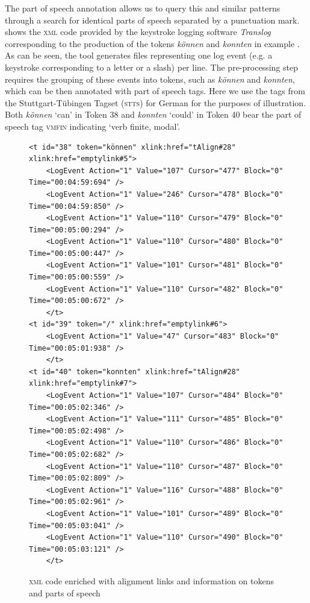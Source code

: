 \documentclass[output=paper]{LSP/langsci}
\begin{document}
The part of speech annotation allows us to query this and similar patterns through a search for identical parts of speech separated by a punctuation mark. 
 shows the \textsc{xml} code provided by the keystroke logging software \textit{Translog} corresponding to the production of the tokens \textit{können} and \textit{konnten} in example . As can be seen, the tool generates files representing one log event (e.g. a keystroke corresponding to a letter or a slash) per line. The pre-processing step requires the grouping of these events into tokens, such as \textit{können} and \textit{konnten}, which can be then annotated with part of speech tags. Here we use the tags from the Stuttgart-Tübingen Tagset (\textsc{stts}) for German \citep{Schiller1999} for the purposes of illustration. Both \textit{können} `can' in Token 38 and \textit{konnten} `could' in Token 40 bear the part of speech tag \textsc{vmfin} indicating `verb finite, modal'. 


\begin{figure}[t]

\caption{\textsc{xml} code enriched with alignment links and information on tokens and parts of speech} \label{fig:1:2}
\begin{lstlisting}
<t id="38" token="können" xlink:href="tAlign#28" xlink:href="emptylink#5">
    <LogEvent Action="1" Value="107" Cursor="477" Block="0" Time="00:04:59:694" />
    <LogEvent Action="1" Value="246" Cursor="478" Block="0" Time="00:04:59:850" />
    <LogEvent Action="1" Value="110" Cursor="479" Block="0" Time="00:05:00:294" />
    <LogEvent Action="1" Value="110" Cursor="480" Block="0" Time="00:05:00:447" />
    <LogEvent Action="1" Value="101" Cursor="481" Block="0" Time="00:05:00:559" />
    <LogEvent Action="1" Value="110" Cursor="482" Block="0" Time="00:05:00:672" />
	</t>
<t id="39" token="/" xlink:href="emptylink#6">
    <LogEvent Action="1" Value="47" Cursor="483" Block="0" Time="00:05:01:938" />
	</t>
<t id="40" token="konnten" xlink:href="tAlign#28" xlink:href="emptylink#7">
    <LogEvent Action="1" Value="107" Cursor="484" Block="0" Time="00:05:02:346" />
    <LogEvent Action="1" Value="111" Cursor="485" Block="0" Time="00:05:02:498" />
    <LogEvent Action="1" Value="110" Cursor="486" Block="0" Time="00:05:02:682" />
    <LogEvent Action="1" Value="110" Cursor="487" Block="0" Time="00:05:02:809" />
    <LogEvent Action="1" Value="116" Cursor="488" Block="0" Time="00:05:02:961" />
    <LogEvent Action="1" Value="101" Cursor="489" Block="0" Time="00:05:03:041" />
    <LogEvent Action="1" Value="110" Cursor="490" Block="0" Time="00:05:03:121" />
	</t>
\end{lstlisting}

\end{figure} 
\end{document}
